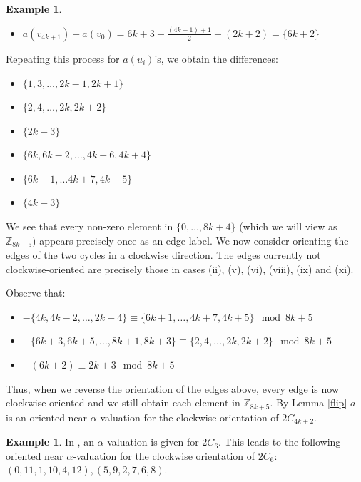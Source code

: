 \documentclass[12pt, a4paper]{article}
\theoremstyle{definition}
\newtheorem{example}[theorem]{Example}
\begin{document}
\begin{example}
\begin{itemize}
    \item [(vi)]$a(v_{4k+1})-a(v_{0})=6k+3+\frac{(4k+1)+1}{2} -(2k+2)= \{6k+2\}$
\end{itemize}
Repeating this process for $a(u_i)$'s, we obtain the differences:
    \begin{itemize}
        \item [(vii)]$\{1,3,\ldots, 2k-1,2k+1\}$
        \item [(viii)]$\{2,4,\ldots, 2k,2k+2\}$
        \item [(ix)]$\{2k+3\}$
        \item [(x)]$\{6k,6k-2,\ldots,4k+6,4k+4\}$
        \item [(xi)]$\{6k+1,\ldots 4k+7,4k+5\}$
        \item [(xii)]$\{4k+3\}$
    \end{itemize}
    We see that every non-zero element in $\{0,\ldots, 8k+4\}$ (which we will view as $\mathbb{Z}_{8k+5}$) appears precisely once as an edge-label.
    We now consider orienting the edges of the two cycles in a clockwise direction. The edges currently not clockwise-oriented are precisely those in cases (ii), (v), (vi), (viii), (ix) and (xi).

Observe that:
\begin{itemize}
\item $-\{4k,4k-2, \ldots, 2k+4\} \equiv \{6k+1,\ldots,4k+7,4k+5\} \mod 8k+5$
\item $-\{6k+3,6k+5,\ldots, 8k+1,8k+3\} \equiv \{2,4,\ldots, 2k,2k+2\} \mod 8k+5$
\item $-(6k+2) \equiv 2k+3 \mod 8k+5$
\end{itemize}
Thus, when we reverse the orientation of the edges above, every edge is now clockwise-oriented and we still obtain each element in $\mathbb{Z}_{8k+5}$. By Lemma \ref{flip} $a$ is an oriented near $\alpha$-valuation for the clockwise orientation of $2C_{4k+2}$.
\end{example}

\begin{example}\label{ex:2C6}
In \cite{Kot}, an $\alpha$-valuation is given for $2C_6$.  This leads to the following oriented near $\alpha$-valuation for the clockwise orientation of $2C_6$: $(0,11,1,10,4,12), (5,9,2,7,6,8)$.
\end{example}
\end{document}
